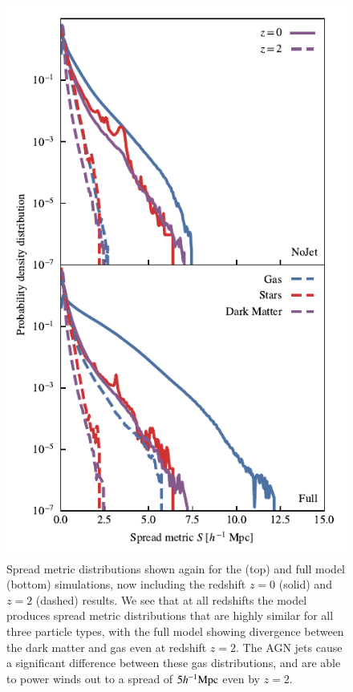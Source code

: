 \begin{figure}
    \centering
    \includegraphics[width=\columnwidth]{figures/neighbour_analysis_hist_redshift.pdf}
    \vspace{-0.7cm}
    \caption{Spread metric distributions shown again for the
    \nojet{} (top) and full \simba{} model (bottom) simulations, now including
    the redshift $z=0$ (solid) and $z=2$ (dashed) results. We see that at all
    redshifts the \nojet{} model produces spread metric distributions that
    are highly similar for all three particle types, with the full \simba{}
    model showing divergence between the dark matter and gas even at
    redshift $z=2$. The AGN jets cause a significant difference between
    these gas distributions, and are able to power winds out to a spread of
    $5h^{-1}{\rm Mpc}{}$ even by $z=2$.}
    \label{fig:zevodist}
\end{figure}

